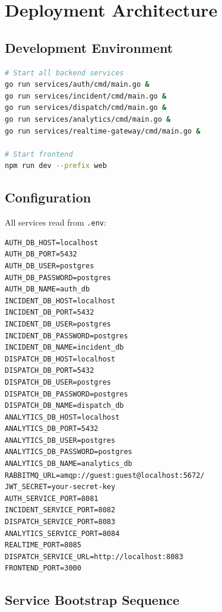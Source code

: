 \documentclass[12pt,a4paper]{report}
\begin{document}
\chapter{Deployment Architecture}

\section{Development Environment}

\begin{lstlisting}[language=bash, caption=Service Startup]
# Start all backend services
go run services/auth/cmd/main.go &
go run services/incident/cmd/main.go &
go run services/dispatch/cmd/main.go &
go run services/analytics/cmd/main.go &
go run services/realtime-gateway/cmd/main.go &

# Start frontend
npm run dev --prefix web
\end{lstlisting}

\section{Configuration}

All services read from \texttt{.env}:

\begin{lstlisting}[caption=Environment Variables]
AUTH_DB_HOST=localhost
AUTH_DB_PORT=5432
AUTH_DB_USER=postgres
AUTH_DB_PASSWORD=postgres
AUTH_DB_NAME=auth_db
INCIDENT_DB_HOST=localhost
INCIDENT_DB_PORT=5432
INCIDENT_DB_USER=postgres
INCIDENT_DB_PASSWORD=postgres
INCIDENT_DB_NAME=incident_db
DISPATCH_DB_HOST=localhost
DISPATCH_DB_PORT=5432
DISPATCH_DB_USER=postgres
DISPATCH_DB_PASSWORD=postgres
DISPATCH_DB_NAME=dispatch_db
ANALYTICS_DB_HOST=localhost
ANALYTICS_DB_PORT=5432
ANALYTICS_DB_USER=postgres
ANALYTICS_DB_PASSWORD=postgres
ANALYTICS_DB_NAME=analytics_db
RABBITMQ_URL=amqp://guest:guest@localhost:5672/
JWT_SECRET=your-secret-key
AUTH_SERVICE_PORT=8081
INCIDENT_SERVICE_PORT=8082
DISPATCH_SERVICE_PORT=8083
ANALYTICS_SERVICE_PORT=8084
REALTIME_PORT=8085
DISPATCH_SERVICE_URL=http://localhost:8083
FRONTEND_PORT=3000
\end{lstlisting}

\section{Service Bootstrap Sequence}
\end{document}
